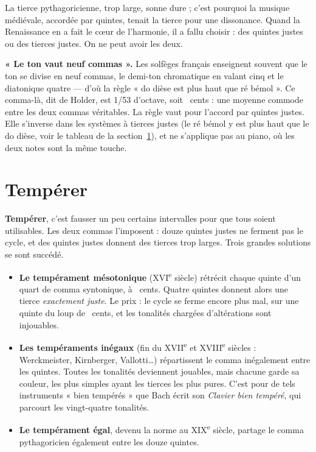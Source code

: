 \documentclass[a4paper,11pt]{article}
\begin{document}
La tierce pythagoricienne, trop large, sonne dure ; c'est pourquoi la musique
médiévale, accordée par quintes, tenait la tierce pour une dissonance. Quand
la Renaissance en a fait le cœur de l'harmonie, il a fallu choisir : des
quintes justes ou des tierces justes. On ne peut avoir les deux.

\begin{remarque}
\textbf{« Le ton vaut neuf commas ».} Les solfèges français enseignent souvent
que le ton se divise en neuf commas, le demi-ton chromatique en valant cinq et
le diatonique quatre --- d'où la règle « do dièse est plus haut que ré
bémol ». Ce comma-là, dit de Holder, est 1/53 d'octave, soit
\commaHolder~cents : une moyenne commode entre les deux commas véritables. La
règle vaut pour l'accord par quintes justes. Elle s'inverse dans les systèmes
à tierces justes (le ré bémol y est plus haut que le do dièse, voir le
tableau de la section~\ref{sec:temperaments}), et ne s'applique pas au piano,
où les deux notes sont la même touche.
\end{remarque}

\section{Tempérer}
\label{sec:temperaments}

\textbf{Tempérer}, c'est fausser un peu certains intervalles pour que tous
soient utilisables. Les deux commas l'imposent : douze quintes justes ne
ferment pas le cycle, et des quintes justes donnent des tierces trop larges.
Trois grandes solutions se sont succédé.

\begin{itemize}
  \item \textbf{Le tempérament mésotonique} (XVI\textsuperscript{e} siècle)
    rétrécit chaque quinte d'un quart de comma syntonique, à \quinteMeso~cents.
    Quatre quintes donnent alors une tierce \emph{exactement juste}. Le prix :
    le cycle se ferme encore plus mal, sur une quinte du loup de
    \loupMeso~cents, et les tonalités chargées d'altérations sont injouables.
  \item \textbf{Les tempéraments inégaux} (fin du XVII\textsuperscript{e} et
    XVIII\textsuperscript{e} siècles : Werckmeister, Kirnberger, Vallotti\ldots)
    répartissent le comma inégalement entre les quintes. Toutes les tonalités
    deviennent jouables, mais chacune garde sa couleur, les plus simples ayant
    les tierces les plus pures. C'est pour de tels instruments « bien
    tempérés » que Bach écrit son \emph{Clavier bien tempéré}, qui parcourt
    les vingt-quatre tonalités.
  \item \textbf{Le tempérament égal}, devenu la norme au XIX\textsuperscript{e}
    siècle, partage le comma pythagoricien également entre les douze quintes.
\end{itemize}
\end{document}
